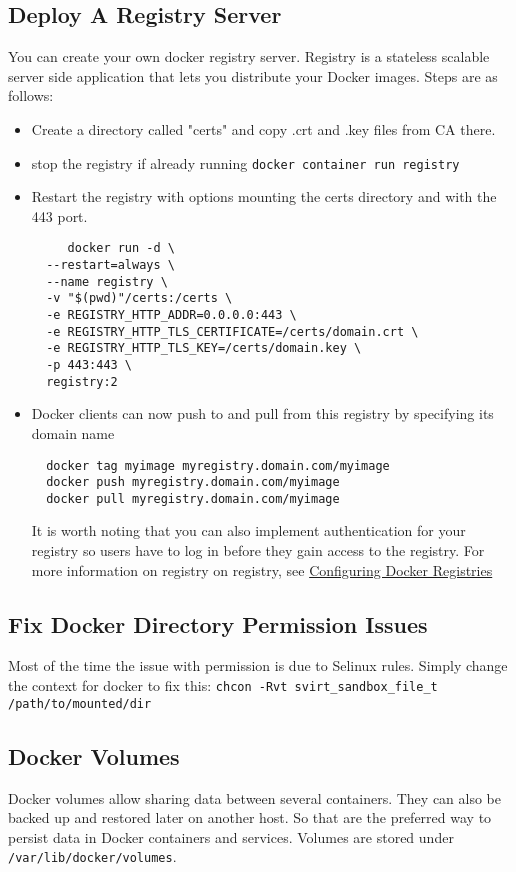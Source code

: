 \documentclass{article}
\begin{document}
\subsection{Deploy A Registry Server}
You can create your own docker registry server. Registry is a stateless scalable server side application that lets you distribute your Docker images.
Steps are as follows:  
\begin{itemize}
\item Create a directory called "certs" and copy .crt and .key files from CA there. 
\item stop the registry if already running \lstinline{docker container run registry}   
\item Restart the registry with options mounting the certs directory and with the 443 port.  

\begin{verbatim}
	 docker run -d \
  --restart=always \
  --name registry \
  -v "$(pwd)"/certs:/certs \
  -e REGISTRY_HTTP_ADDR=0.0.0.0:443 \
  -e REGISTRY_HTTP_TLS_CERTIFICATE=/certs/domain.crt \
  -e REGISTRY_HTTP_TLS_KEY=/certs/domain.key \
  -p 443:443 \
  registry:2  
\end{verbatim}
\item Docker clients can now push to and pull from this registry by specifying its domain name
\begin{verbatim}
  docker tag myimage myregistry.domain.com/myimage
  docker push myregistry.domain.com/myimage
  docker pull myregistry.domain.com/myimage   
\end{verbatim}
It is worth noting that you can also implement authentication for your registry so users have to log in before they gain access to the registry. 
For more information on registry on registry, see \href{https://docs.docker.com/registry}{Configuring Docker Registries}
\end{itemize}

\subsection{Fix Docker Directory Permission Issues}

Most of the time the issue with permission is due to Selinux rules. Simply change the context for docker to fix this:   \lstinline{chcon -Rvt svirt_sandbox_file_t /path/to/mounted/dir}

\subsection{Docker Volumes}
Docker volumes allow sharing data between several containers. They can also be backed up and restored later on another host. So that are the preferred way to persist data in Docker containers and services. Volumes are stored under \lstinline{/var/lib/docker/volumes}.
\end{document}
